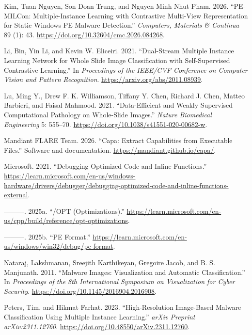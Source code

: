\documentclass[
  10pt,
]{article}
\newlength{\cslhangindent}
\newenvironment{CSLReferences}[2] %
 {\begin{list}{}{%
  \setlength{\itemindent}{0pt}
  \setlength{\leftmargin}{0pt}
  \setlength{\parsep}{0pt}
  \ifodd #1
   \setlength{\leftmargin}{\cslhangindent}
   \setlength{\itemindent}{-1\cslhangindent}
  \fi
  \setlength{\itemsep}{#2\baselineskip}}}
 {\end{list}}
\begin{document}
\begin{CSLReferences}{1}{0}
Kim, Tuan Nguyen, Son Doan Trung, and Nguyen Minh Nhut Pham. 2026.
{``{PE-MILCon}: Multiple-Instance Learning with Contrastive Multi-View
Representation for Static Windows PE Malware Detection.''}
\emph{Computers, Materials \& Continua} 89 (1): 43.
\url{https://doi.org/10.32604/cmc.2026.084268}.

Li, Bin, Yin Li, and Kevin W. Eliceiri. 2021. {``Dual-Stream Multiple
Instance Learning Network for Whole Slide Image Classification with
Self-Supervised Contrastive Learning.''} In \emph{Proceedings of the
IEEE/CVF Conference on Computer Vision and Pattern Recognition}.
\url{https://arxiv.org/abs/2011.08939}.

Lu, Ming Y., Drew F. K. Williamson, Tiffany Y. Chen, Richard J. Chen,
Matteo Barbieri, and Faisal Mahmood. 2021. {``Data-Efficient and Weakly
Supervised Computational Pathology on Whole-Slide Images.''}
\emph{Nature Biomedical Engineering} 5: 555--70.
\url{https://doi.org/10.1038/s41551-020-00682-w}.

Mandiant FLARE Team. 2026. {``Capa: Extract Capabilities from Executable
Files.''} Software and documentation.
\url{https://mandiant.github.io/capa/}.

Microsoft. 2021. {``Debugging Optimized Code and Inline Functions.''}
\url{https://learn.microsoft.com/en-us/windows-hardware/drivers/debugger/debugging-optimized-code-and-inline-functions-external}.

---------. 2025a. {``/OPT (Optimizations).''}
\url{https://learn.microsoft.com/en-us/cpp/build/reference/opt-optimizations}.

---------. 2025b. {``PE Format.''}
\url{https://learn.microsoft.com/en-us/windows/win32/debug/pe-format}.

Nataraj, Lakshmanan, Sreejith Karthikeyan, Gregoire Jacob, and B. S.
Manjunath. 2011. {``Malware Images: Visualization and Automatic
Classification.''} In \emph{Proceedings of the 8th International
Symposium on Visualization for Cyber Security}.
\url{https://doi.org/10.1145/2016904.2016908}.

Peters, Tim, and Hikmat Farhat. 2023. {``High-Resolution Image-Based
Malware Classification Using Multiple Instance Learning.''} \emph{arXiv
Preprint arXiv:2311.12760}.
\url{https://doi.org/10.48550/arXiv.2311.12760}.


\end{CSLReferences}
\end{document}
